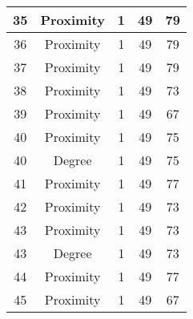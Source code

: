 \documentclass[results.tex]{subfiles}
\begin{document}
\begin{center}
\begin{tabular}{| c || c | c | c | c |}
            \hline
            35                      & Proximity                    & 1                      & 49                      & 79                   \\
            \hline
            36                      & Proximity                    & 1                      & 49                      & 79                   \\
            \hline
            37                      & Proximity                    & 1                      & 49                      & 79                   \\
            \hline
            38                      & Proximity                    & 1                      & 49                      & 73                   \\
            \hline
            39                      & Proximity                    & 1                      & 49                      & 67                   \\
            \hline
            40                      & Proximity                    & 1                      & 49                      & 75                   \\
            \hline
            40                      & Degree                       & 1                      & 49                      & 75                   \\
            \hline
            41                      & Proximity                    & 1                      & 49                      & 77                   \\
            \hline
            42                      & Proximity                    & 1                      & 49                      & 73                   \\
            \hline
            43                      & Proximity                    & 1                      & 49                      & 73                   \\
            \hline
            43                      & Degree                       & 1                      & 49                      & 73                   \\
            \hline
            44                      & Proximity                    & 1                      & 49                      & 77                   \\
            \hline
            45                      & Proximity                    & 1                      & 49                      & 67                   \\

\end{tabular}
\end{center}
\end{document}
